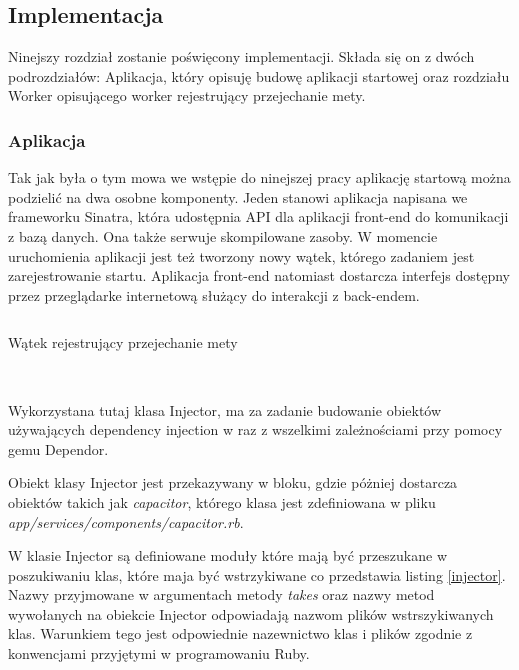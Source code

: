 \documentclass[11pt,a4paper, twoside]{article}
\begin{document}
\subsection{Implementacja}
Ninejszy rozdział zostanie poświęcony implementacji. Składa się on z dwóch podrozdziałów: Aplikacja, który opisuję budowę aplikacji startowej oraz rozdziału Worker opisującego worker rejestrujący przejechanie mety.
\subsubsection{Aplikacja}
Tak jak była o tym mowa we wstępie do ninejszej pracy aplikację startową można podzielić na dwa osobne komponenty. Jeden stanowi aplikacja napisana we frameworku Sinatra, która udostępnia API dla aplikacji front-end do komunikacji z bazą danych. Ona także serwuje skompilowane zasoby. W momencie uruchomienia aplikacji jest też tworzony nowy wątek, którego zadaniem jest zarejestrowanie startu. 
	Aplikacja front-end natomiast dostarcza interfejs dostępny przez przeglądarke internetową służący do interakcji z back-endem.
\begin{listing}[H]
\inputminted[linenos=true]{ruby}{./src/thread.rb}
\caption{Wątek rejestrujący przejechanie mety}
$\label{thread}$
\end{listing}
\newpage
\noindent
Wykorzystana tutaj klasa Injector, ma za zadanie budowanie obiektów używających dependency injection w raz z wszelkimi zależnościami przy pomocy gemu Dependor. 


Obiekt klasy Injector jest 	przekazywany w bloku, gdzie póżniej dostarcza obiektów takich jak \emph{capacitor}, którego klasa jest zdefiniowana w pliku \newline \emph{app/services/components/capacitor.rb}. 

W klasie Injector są definiowane moduły które mają być przeszukane w poszukiwaniu klas, które maja być wstrzykiwane co przedstawia listing \ref{injector}. Nazwy przyjmowane w argumentach metody \emph{takes} oraz nazwy metod wywołanych na obiekcie Injector odpowiadają nazwom plików wstrszykiwanych klas. Warunkiem tego jest odpowiednie nazewnictwo klas i plików zgodnie z konwencjami przyjętymi w programowaniu Ruby.
\end{document}
